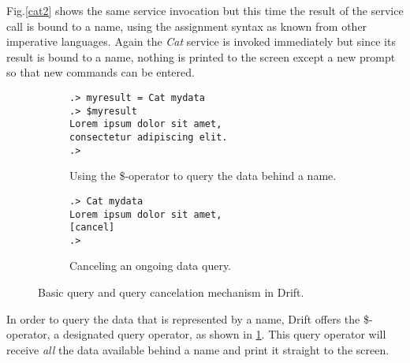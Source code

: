Fig.\ref{cat2} shows the same service invocation but this time the
result of the service call is bound to a name, using the assignment
syntax as known from other imperative languages. Again the
\textit{Cat} service is invoked immediately but since its result
is bound to a name, nothing is printed to the screen except a new
prompt so that new commands can be entered.

\begin{figure}[h]
    \centering
    \begin{subfigure}[b]{0.4\textwidth}

  \begin{lstlisting}
.> myresult = Cat mydata
.> $myresult
Lorem ipsum dolor sit amet,
consectetur adipiscing elit.
.>
  \end{lstlisting}

        \caption{Using the \$-operator to query the data behind a name.}
        \label{cat3}
    \end{subfigure}
    \hspace{20pt} %
    \begin{subfigure}[b]{0.4\textwidth}

  \begin{lstlisting}
.> Cat mydata
Lorem ipsum dolor sit amet,
[cancel]
.>
  \end{lstlisting}

        \caption{Canceling an ongoing data query.\\}
        \label{cat4}
    \end{subfigure}
    \caption{Basic query and query cancelation mechanism in Drift.}\label{drift-examples2}
\end{figure}

In order to query the data that is represented by a name, Drift offers
the \$-operator, a designated query operator, as shown in \ref{cat3}.
This query operator will receive \textit{all} the data available
behind a name and print it straight to the screen.

